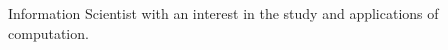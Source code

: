 \begin{cvparagraph}

Information Scientist with an interest in the study and applications of computation.
\end{cvparagraph}

